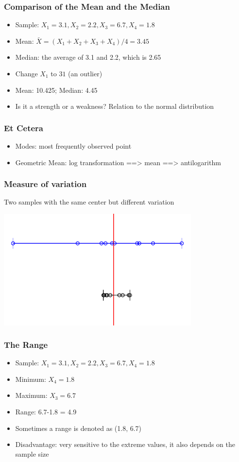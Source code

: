 \begin{frame} \frametitle{Comparison of the Mean and the Median}
  \begin{itemize}
  \item Sample: $X_1=3.1, X_2=2.2, X_3=6.7, X_4=1.8$
  \item Mean: $\bar{X} = (X_1+X_2+X_3+X_4)/4=3.45$
  \item Median: the average of 3.1 and 2.2, which is 2.65
  \item Change $X_1$ to $31$ (an outlier)
  \item Mean: 10.425; Median: 4.45
  \item Is it a strength or a weakness? Relation to the normal distribution
  \end{itemize}
\end{frame}

\begin{frame} \frametitle{Et Cetera}
  \begin{itemize}
  \item Modes: most frequently observed point
  \item Geometric Mean: log transformation ==> mean ==> antilogarithm
  \end{itemize}
\end{frame}

\begin{frame} \frametitle{Measure of variation}
  Two samples with the same \alert{center} but different \alert{variation}
  \begin{center}
    \includegraphics[height=2.4in]{spread.pdf}
  \end{center}
\end{frame}

\begin{frame} \frametitle{The Range}
  \begin{itemize}
  \item Sample: $X_1=3.1, X_2=2.2, X_3=6.7, X_4=1.8$
  \item Minimum: $X_4=1.8$
  \item Maximum: $X_3=6.7$
  \item Range: 6.7-1.8 = 4.9
  \item Sometimes a range is denoted as (1.8, 6.7)
  \item Disadvantage: very sensitive to the extreme values, it also
    depends on the sample size
  \end{itemize}
\end{frame}

